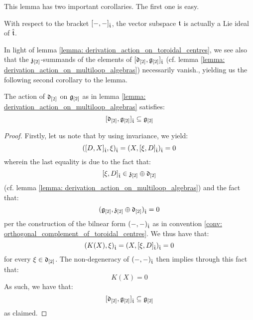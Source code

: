         This lemma has two important corollaries. The first one is easy.
        \begin{corollary}
            With respect to the bracket $[-, -]_{\hat{\mathfrak{t}}}$, the vector subspace $\mathfrak{t}$ is actually a Lie ideal of $\hat{\mathfrak{t}}$.
        \end{corollary}
        In light of lemma \ref{lemma: derivation_action_on_toroidal_centres}, we see also that the $\mathfrak{z}_{[2]}$-summands of the elements of $[\mathfrak{d}_{[2]}, \mathfrak{g}_{[2]}]_{\hat{\mathfrak{t}}}$ (cf. lemma \ref{lemma: derivation_action_on_multiloop_algebras}) necessarily vanish., yielding us the following second corollary to the lemma. 
        \begin{corollary} \label{coro: derivation_action_on_multiloop_algebras}
            The action of $\mathfrak{d}_{[2]}$ on $\mathfrak{g}_{[2]}$ as in lemma \ref{lemma: derivation_action_on_multiloop_algebras} satisfies:
                $$[\mathfrak{d}_{[2]}, \mathfrak{g}_{[2]}]_{\hat{\mathfrak{t}}} \subseteq \mathfrak{g}_{[2]}$$
        \end{corollary}
            \begin{proof}
                Firstly, let us note that by using invariance, we yield:
                    $$( [ D, X ]_{\hat{\mathfrak{t}}}, \xi )_{\hat{\mathfrak{t}}} = (X, [\xi, D]_{\hat{\mathfrak{t}}})_{\hat{\mathfrak{t}}} = 0$$
                wherein the last equality is due to the fact that:
                    $$[\xi, D]_{\hat{\mathfrak{t}}} \in \mathfrak{z}_{[2]} \oplus \mathfrak{d}_{[2]}$$
                (cf. lemma \ref{lemma: derivation_action_on_multiloop_algebras}) and the fact that:
                    $$( \mathfrak{g}_{[2]}, \mathfrak{z}_{[2]} \oplus \mathfrak{d}_{[2]} )_{\hat{\mathfrak{t}}} = 0$$
                per the construction of the bilnear form $(-, -)_{\hat{\mathfrak{t}}}$ as in convention \ref{conv: orthogonal_complement_of_toroidal_centres}. We thus have that:
                    $$(K(X), \xi)_{\hat{\mathfrak{t}}} = (X, [\xi, D]_{\hat{\mathfrak{t}}})_{\hat{\mathfrak{t}}} = 0$$
                for every $\xi \in \mathfrak{d}_{[2]}$. The non-degeneracy of $(-, -)_{\hat{\mathfrak{t}}}$ then implies through this fact that:
                    $$K(X) = 0$$
                As such, we have that:
                    $$[ \mathfrak{d}_{[2]}, \mathfrak{g}_{[2]} ]_{\hat{\mathfrak{t}}} \subseteq \mathfrak{g}_{[2]}$$
                as claimed. 
            \end{proof}

